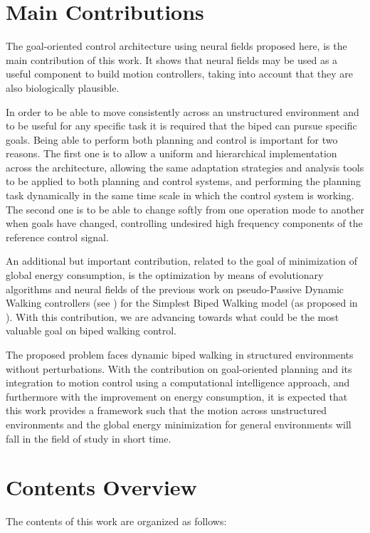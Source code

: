 \section{Main Contributions}
The goal-oriented control architecture using neural fields
proposed here, is the main contribution of this work. It shows that
neural fields may be used as a useful component to build motion
controllers, taking into account that they are also biologically
plausible.

In order to be able to move consistently across an unstructured
environment and to be useful for any specific task it is required that
the biped can pursue specific goals. Being able to perform both
planning and control is important for two reasons. The first one is to
allow a uniform and hierarchical implementation across the
architecture, allowing the same adaptation strategies and analysis
tools to be applied to both planning and control systems, and
performing the planning task dynamically in the same time scale in
which the control system is working. The second one is to be able to
change softly from one operation mode to another when goals have
changed, controlling undesired high frequency components of the
reference control signal.

An additional but important contribution, related to the goal of
minimization of global energy consumption, is the
optimization by means of evolutionary algorithms and neural fields of
the previous work on pseudo-Passive Dynamic Walking controllers (see
\cite{Wisse05How}) for the Simplest Biped Walking model (as proposed
in \cite{Garcia98simplest}). With this contribution, we are advancing
towards what could be the most valuable goal on biped walking control.

The proposed problem faces dynamic biped walking in structured
environments without perturbations. With the contribution on
goal-oriented planning and its integration to motion control using a
computational intelligence approach, and furthermore with the
improvement on energy consumption, it is expected that this work
provides a framework such that the motion across unstructured
environments and the global energy minimization for general
environments will fall in the field of study in short time.

\section{Contents Overview}
The contents of this work are organized as follows:

